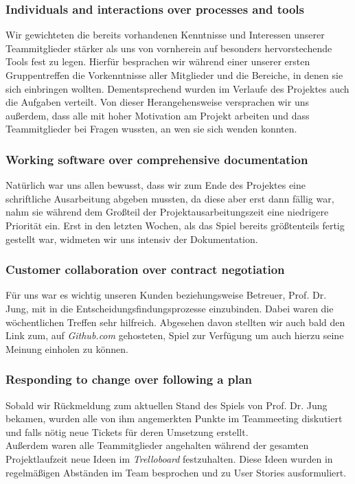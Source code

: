 \documentclass[11pt]{article}
\begin{document}
\subsubsection{Individuals and interactions over processes and tools}
Wir gewichteten die bereits vorhandenen Kenntnisse und Interessen unserer Teammitglieder stärker als uns von vornherein auf besonders hervorstechende Tools fest zu legen. Hierfür besprachen wir während einer unserer ersten Gruppentreffen die Vorkenntnisse aller Mitglieder und die Bereiche, in denen sie sich einbringen wollten. Dementsprechend wurden im Verlaufe des Projektes auch die Aufgaben verteilt. Von dieser Herangehensweise versprachen wir uns außerdem, dass alle mit hoher Motivation am Projekt arbeiten und dass Teammitglieder bei Fragen wussten, an wen sie sich wenden konnten.
\subsubsection{Working software over comprehensive documentation}
Natürlich war uns allen bewusst, dass wir zum Ende des Projektes eine schriftliche Ausarbeitung abgeben mussten, da diese aber erst dann fällig war, nahm sie während dem Großteil der Projektausarbeitungszeit eine niedrigere Priorität ein. Erst in den letzten Wochen, als das Spiel bereits größtenteils fertig gestellt war, widmeten wir uns intensiv der Dokumentation.
\subsubsection{Customer collaboration over contract negotiation}
Für uns war es wichtig unseren Kunden beziehungsweise Betreuer, Prof. Dr. Jung, mit in die Entscheidungsfindungsprozesse einzubinden. Dabei waren die wöchentlichen Treffen sehr hilfreich. Abgesehen davon stellten wir auch bald den Link zum, auf \textit{Github.com} gehosteten, Spiel zur Verfügung um auch hierzu seine Meinung einholen zu können. 
\subsubsection{Responding to change over following a plan}
Sobald wir Rückmeldung zum aktuellen Stand des Spiels von Prof. Dr. Jung bekamen, wurden alle von ihm angemerkten Punkte im Teammeeting diskutiert und falls nötig neue Tickets für deren Umsetzung erstellt.\\
Außerdem waren alle Teammitglieder angehalten während der gesamten Projektlaufzeit neue Ideen im \textit{Trelloboard} festzuhalten. Diese Ideen wurden in regelmäßigen Abständen im Team besprochen und zu User Stories ausformuliert.
\end{document}
